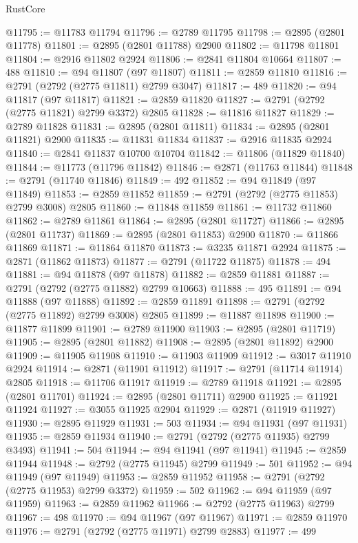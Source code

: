 \begin{lexlean}{RustCore}
\begin{coremodule}
@11795 := @11783 @11794
@11796 := @2789 @11795
@11798 := @2895 (@2801 @11778)
@11801 := @2895 (@2801 @11788) @2900
@11802 := @11798 @11801
@11804 := @2916 @11802 @2924
@11806 := @2841 @11804 @10664
@11807 := 488
@11810 := @94 @11807 (@97 @11807)
@11811 := @2859 @11810
@11816 := @2791 (@2792 (@2775 @11811) @2799 @3047)
@11817 := 489
@11820 := @94 @11817 (@97 @11817)
@11821 := @2859 @11820
@11827 := @2791 (@2792 (@2775 @11821) @2799 @3372) @2805
@11828 := @11816 @11827
@11829 := @2789 @11828
@11831 := @2895 (@2801 @11811)
@11834 := @2895 (@2801 @11821) @2900
@11835 := @11831 @11834
@11837 := @2916 @11835 @2924
@11840 := @2841 @11837 @10700 @10704
@11842 := @11806 (@11829 @11840)
@11844 := @11773 (@11796 @11842)
@11846 := @2871 (@11763 @11844)
@11848 := @2791 (@11740 @11846)
@11849 := 492
@11852 := @94 @11849 (@97 @11849)
@11853 := @2859 @11852
@11859 := @2791 (@2792 (@2775 @11853) @2799 @3008) @2805
@11860 := @11848 @11859
@11861 := @11732 @11860
@11862 := @2789 @11861
@11864 := @2895 (@2801 @11727)
@11866 := @2895 (@2801 @11737)
@11869 := @2895 (@2801 @11853) @2900
@11870 := @11866 @11869
@11871 := @11864 @11870
@11873 := @3235 @11871 @2924
@11875 := @2871 (@11862 @11873)
@11877 := @2791 (@11722 @11875)
@11878 := 494
@11881 := @94 @11878 (@97 @11878)
@11882 := @2859 @11881
@11887 := @2791 (@2792 (@2775 @11882) @2799 @10663)
@11888 := 495
@11891 := @94 @11888 (@97 @11888)
@11892 := @2859 @11891
@11898 := @2791 (@2792 (@2775 @11892) @2799 @3008) @2805
@11899 := @11887 @11898
@11900 := @11877 @11899
@11901 := @2789 @11900
@11903 := @2895 (@2801 @11719)
@11905 := @2895 (@2801 @11882)
@11908 := @2895 (@2801 @11892) @2900
@11909 := @11905 @11908
@11910 := @11903 @11909
@11912 := @3017 @11910 @2924
@11914 := @2871 (@11901 @11912)
@11917 := @2791 (@11714 @11914) @2805
@11918 := @11706 @11917
@11919 := @2789 @11918
@11921 := @2895 (@2801 @11701)
@11924 := @2895 (@2801 @11711) @2900
@11925 := @11921 @11924
@11927 := @3055 @11925 @2904
@11929 := @2871 (@11919 @11927)
@11930 := @2895 @11929
@11931 := 503
@11934 := @94 @11931 (@97 @11931)
@11935 := @2859 @11934
@11940 := @2791 (@2792 (@2775 @11935) @2799 @3493)
@11941 := 504
@11944 := @94 @11941 (@97 @11941)
@11945 := @2859 @11944
@11948 := @2792 (@2775 @11945) @2799
@11949 := 501
@11952 := @94 @11949 (@97 @11949)
@11953 := @2859 @11952
@11958 := @2791 (@2792 (@2775 @11953) @2799 @3372)
@11959 := 502
@11962 := @94 @11959 (@97 @11959)
@11963 := @2859 @11962
@11966 := @2792 (@2775 @11963) @2799
@11967 := 498
@11970 := @94 @11967 (@97 @11967)
@11971 := @2859 @11970
@11976 := @2791 (@2792 (@2775 @11971) @2799 @2883)
@11977 := 499

\end{coremodule}
\end{lexlean}
